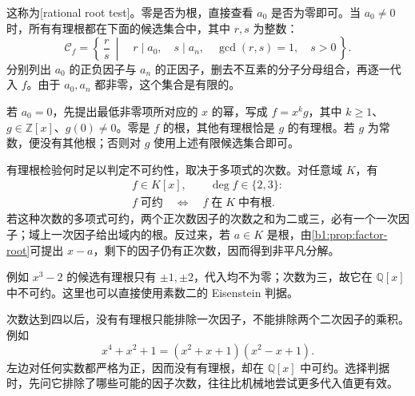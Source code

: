 这称为[rational root test]。零是否为根，直接查看 \(a_0\) 是否为零即可。当 \(a_0\ne0\) 时，所有有理根都在下面的候选集合中，其中 \(r,s\) 为整数：
\[
	\mathcal C_f= \left\{\,\frac{r}{s}\ \middle|\quad r\mid a_0,\quad s\mid a_n,\quad \gcd(r,s)=1,\quad s>0\,\right\}.
\]
分别列出 \(a_0\) 的正负因子与 \(a_n\) 的正因子，删去不互素的分子分母组合，再逐一代入 \(f\)。由于 \(a_0,a_n\) 都非零，这个集合是有限的。

\ProseParagraphBreak
若 \(a_0=0\)，先提出最低非零项所对应的 \(x\) 的幂，写成 \(f=x^kg\)，其中 \(k\ge1\)、\(g\in\mathbb Z[x]\)、\(g(0)\ne0\)。零是 \(f\) 的根，其他有理根恰是 \(g\) 的有理根。若 \(g\) 为常数，便没有其他根；否则对 \(g\) 使用上述有限候选集合即可。

\ProseParagraphBreak
有理根检验何时足以判定不可约性，取决于多项式的次数。对任意域 \(K\)，有
\[
	\boxed{
		\begin{gathered}
			f\in K[x],\qquad \deg f\in\{2,3\}:\\
			f\;\text{可约}\quad\Longleftrightarrow\quad f\;\text{在}\;K\;\text{中有根}.
		\end{gathered}}
\]
若这种次数的多项式可约，两个正次数因子的次数之和为二或三，必有一个一次因子；域上一次因子给出域内的根。反过来，若 \(a\in K\) 是根，由\cref{b1:prop:factor-root}可提出 \(x-a\)，剩下的因子仍有正次数，因而得到非平凡分解。

\ProseParagraphBreak
例如 \(x^3-2\) 的候选有理根只有 \(\pm1,\pm2\)，代入均不为零；次数为三，故它在 \(\mathbb Q[x]\) 中不可约。这里也可以直接使用素数二的 Eisenstein 判据。

\ProseParagraphBreak
次数达到四以后，没有有理根只能排除一次因子，不能排除两个二次因子的乘积。例如
\[
	x^4+x^2+1=(x^2+x+1)(x^2-x+1).
\]
左边对任何实数都严格为正，因而没有有理根，却在 \(\mathbb Q[x]\) 中可约。选择判据时，先问它排除了哪些可能的因子次数，往往比机械地尝试更多代入值更有效。

